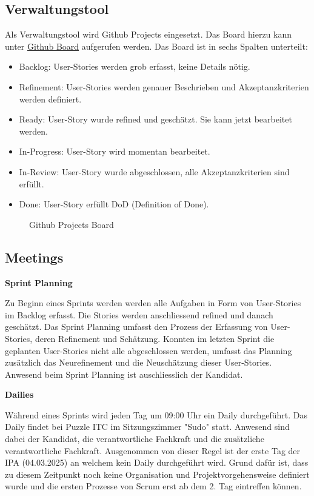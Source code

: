 \subsection{Verwaltungstool}
Als Verwaltungstool wird Github Projects eingesetzt. Das Board hierzu kann unter \href{https://github.com/users/Vakmeth/projects/3/views/1}{Github Board}
aufgerufen werden. Das Board ist in sechs Spalten unterteilt: 

\begin{itemize}
    \item Backlog: User-Stories werden grob erfasst, keine Details nötig.
    \item Refinement: User-Stories werden genauer Beschrieben und Akzeptanzkriterien werden definiert.
    \item Ready: User-Story wurde refined und geschätzt. Sie kann jetzt bearbeitet werden.
    \item In-Progress: User-Story wird momentan bearbeitet.
    \item In-Review: User-Story wurde abgeschlossen, alle Akzeptanzkriterien sind erfüllt.
    \item Done: User-Story erfüllt DoD (Definition of Done).
\end{itemize}

\begin{figure}[h]
    \centering
    \caption{Github Projects Board}
\end{figure}

\subsection{Meetings}
\textbf{Sprint Planning}

Zu Beginn eines Sprints werden werden alle Aufgaben in Form von User-Stories im Backlog erfasst.
Die Stories werden anschliessend refined und danach geschätzt. Das Sprint Planning umfasst den Prozess der Erfassung
von User-Stories, deren Refinement und Schätzung. Konnten im letzten Sprint die geplanten User-Stories nicht alle abgeschlossen werden,
umfasst das Planning zusätzlich das Neurefinement und die Neuschätzung dieser User-Stories. Anwesend beim Sprint Planning ist auschliesslich
der Kandidat.

\textbf{Dailies}

Während eines Sprints wird jeden Tag um 09:00 Uhr ein Daily durchgeführt. Das Daily findet bei Puzzle ITC
im Sitzungszimmer "Sudo" statt. Anwesend sind dabei der Kandidat, die verantwortliche Fachkraft und die zusätzliche verantwortliche
Fachkraft. Ausgenommen von dieser Regel ist der erste Tag der IPA (04.03.2025) an welchem kein Daily durchgeführt wird. Grund dafür ist, dass zu diesem Zeitpunkt noch keine
Organisation und Projektvorgehensweise definiert wurde und die ersten Prozesse von Scrum erst ab dem 2. Tag eintreffen können.

